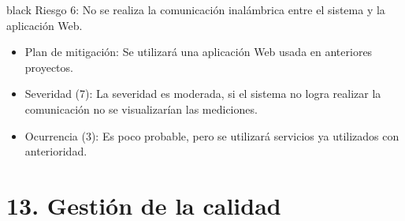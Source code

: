 \documentclass[11pt]{charter}
\begin{document}
\begin{consigna}{black}
Riesgo 6: No se realiza la comunicación inalámbrica entre el sistema y la aplicación Web.
\begin{itemize}
\item Plan de mitigación: Se utilizará una aplicación Web usada en anteriores proyectos. 
\item Severidad (7): La severidad es moderada, si el sistema no logra realizar la comunicación no se visualizarían las mediciones.
\item Ocurrencia (3): Es poco probable, pero se utilizará servicios ya utilizados con anterioridad.
\end{itemize}

\end{consigna}

\vspace{-10px}
\section{13. Gestión de la calidad}
\label{sec:calidad}
\vspace{-30px}
\end{document}
